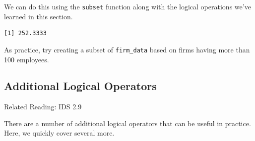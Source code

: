 \documentclass[
  letterpaper,
  DIV=11,
  numbers=noendperiod]{scrreprt}
\newenvironment{Shaded}{\begin{snugshade}}{\end{snugshade}}
\newcommand{\FunctionTok}[1]{\textcolor[rgb]{0.28,0.35,0.67}{#1}}
\newcommand{\NormalTok}[1]{\textcolor[rgb]{0.00,0.23,0.31}{#1}}
\newcommand{\OtherTok}[1]{\textcolor[rgb]{0.00,0.23,0.31}{#1}}
\newcommand{\SpecialCharTok}[1]{\textcolor[rgb]{0.37,0.37,0.37}{#1}}
\newcommand{\StringTok}[1]{\textcolor[rgb]{0.13,0.47,0.30}{#1}}
\begin{document}
We can do this using the \texttt{subset} function along with the logical
operations we've learned in this section.

\begin{Shaded}
\end{Shaded}

\begin{verbatim}
[1] 252.3333
\end{verbatim}

As practice, try creating a subset of \texttt{firm\_data} based on firms
having more than 100 employees.

\subsection{Additional Logical
Operators}\label{additional-logical-operators}

Related Reading: IDS 2.9

There are a number of additional logical operators that can be useful in
practice. Here, we quickly cover several more.
\end{document}
